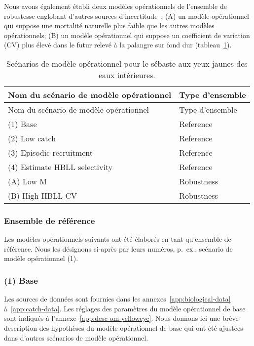 \documentclass[11pt]{book}
\begin{document}
Nous avons également établi deux modèles opérationnels de l'ensemble de robustesse englobant d'autres sources d'incertitude~: (A) un modèle opérationnel qui suppose une mortalité naturelle plus faible que les autres modèles opérationnels; (B) un modèle opérationnel qui suppose un coefficient de variation (CV) plus élevé dans le futur relevé à la palangre sur fond dur (tableau~\ref{tab:ye-scen}).
\begin{longtable}[]{@{}ll@{}}
\caption{\label{tab:ye-scen}Scénarios de modèle opérationnel pour le sébaste aux yeux jaunes des eaux intérieures.}\tabularnewline
\toprule
Nom du scénario de modèle opérationnel & Type d'ensemble\tabularnewline
\midrule
\endfirsthead
\toprule
Nom du scénario de modèle opérationnel & Type d'ensemble\tabularnewline
\midrule
\endhead
(1) Base & Reference\tabularnewline
(2) Low catch & Reference\tabularnewline
(3) Episodic recruitment & Reference\tabularnewline
(4) Estimate HBLL selectivity & Reference\tabularnewline
(A) Low M & Robustness\tabularnewline
(B) High HBLL CV & Robustness\tabularnewline
\bottomrule
\end{longtable}
\hypertarget{sec:approach3-reference}{%
\subsubsection{Ensemble de référence}\label{sec:approach3-reference}}

Les modèles opérationnels suivants ont été élaborés en tant qu'ensemble de référence. Nous les désignons ci-après par leurs numéros, p.~ex., scénario de modèle opérationnel (1).

\hypertarget{sec:approach3-reference1}{%
\subsubsection{(1) Base}\label{sec:approach3-reference1}}

Les sources de données sont fournies dans les annexes~\ref{app:biological-data} à~\ref{app:catch-data}. Les réglages des paramètres du modèle opérationnel de base sont indiqués à l'annexe~\ref{app:desc-om-yelloweye}. Nous donnons ici une brève description des hypothèses du modèle opérationnel de base qui ont été ajustées dans d'autres scénarios de modèle opérationnel.
\end{document}
